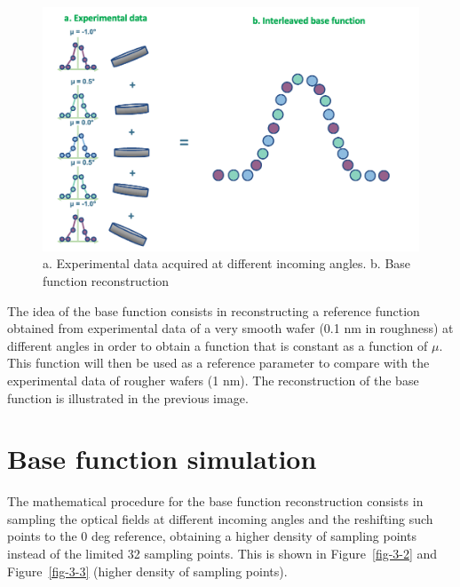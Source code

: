 \documentclass[
  letterpaper,
  DIV=11,
  numbers=noendperiod,
  oneside]{scrreprt}
\begin{document}
\begin{figure}

{\centering \includegraphics{notebooks/figures/b/fig_3_1_base.png}

}

\caption{\label{fig-3-1}a. Experimental data acquired at different
incoming angles. b. Base function reconstruction}

\end{figure}

The idea of the base function consists in reconstructing a reference
function obtained from experimental data of a very smooth wafer (0.1 nm
in roughness) at different angles in order to obtain a function that is
constant as a function of \(\mu\). This function will then be used as a
reference parameter to compare with the experimental data of rougher
wafers (1 nm). The reconstruction of the base function is illustrated in
the previous image.

\hypertarget{base-function-simulation}{%
\section{Base function simulation}\label{base-function-simulation}}

The mathematical procedure for the base function reconstruction consists
in sampling the optical fields at different incoming angles and the
reshifting such points to the 0 deg reference, obtaining a higher
density of sampling points instead of the limited 32 sampling points.
This is shown in Figure~\ref{fig-3-2} and Figure~\ref{fig-3-3} (higher
density of sampling points).
\end{document}
